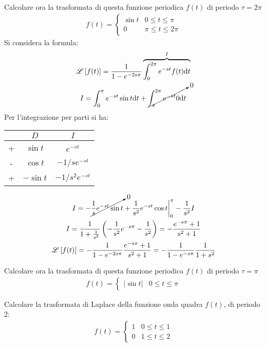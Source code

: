 \documentclass{article}
\newcommand{\df}{\mathrm{d}}
\numberwithin{equation}{subsection}
\begin{document}
Calcolare ora la trasformata di questa funzione periodica $f(t)$ di periodo $\tau=2\pi$
\begin{gather*}
    f(t)=\begin{cases}
        \sin t&0\leq t\leq\pi\\
        0&\pi\leq t\leq2\pi
    \end{cases}
\end{gather*}
Si considera la formula:
\begin{gather*}
    \mathscr{L}\left[f(t)\right]=\frac{1}{1-e^{-2s\pi}}\overbrace{\int_0^{2\pi}e^{-st}f(t)\df t}^I\\
    I=\int_0^\pi e^{-st}\sin t\df t+\cancelto{0}{\int_\pi^{2\pi}e^{-st}0\df t}
\end{gather*}
Per l'integrazione per parti si ha:
\begin{center}
    \begin{tabular}{|c||c|c|}
        \hline
        &$D$&$I$\\\hline
        +&$\sin t$&$e^{-st}$\\\hline
        -&$\cos t$&$-1/se^{-st}$\\\hline
        +&$-\sin t$&$-1/s^2e^{-st}$\\\hline
    \end{tabular}
\end{center}
\begin{gather*}
    I=-\cancelto{0}{\frac{1}{s}e^{-st}\sin t}+\frac{1}{s^2}e^{-st}\cos t\bigg|_0^{\pi}-\frac{1}{s^2}I\\
    I=\frac{1}{1+\frac{1}{s^2}}\left(-\frac{1}{s^2}e^{-s\pi}-\frac{1}{s^2}\right)=-\frac{e^{-s\pi}+1}{s^2+1}\\
    \mathscr{L}\left[f(t)\right]=-\frac{1}{1-e^{-2s\pi}}\frac{e^{-s\pi}+1}{s^2+1}=-\frac{1}{1-e^{-s\pi}}\frac{1}{1+s^2}
\end{gather*}



Calcolare ora la trasformata di questa funzione periodica $f(t)$ di periodo $\tau=\pi$
\begin{gather*}
    f(t)=\begin{cases}
        |\sin t|&0\leq t\leq\pi
    \end{cases}
\end{gather*}

Calcolare la trasformata di Laplace della funzione onda quadra $f(t)$, di periodo 2:
\begin{gather*}
    f(t)=\begin{cases}
        1 & 0\leq t\leq1\\
        0 & 1\leq t\leq2
    \end{cases}
\end{gather*}
\end{document}
